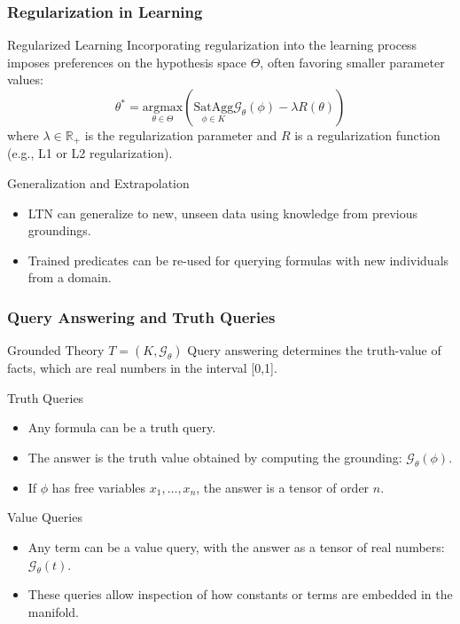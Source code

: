 \documentclass{beamer}
\newcommand{\G}{\mathcal{G}}
\begin{document}
\begin{frame}
\frametitle{Regularization in Learning}
\begin{block}{Regularized Learning}
Incorporating regularization into the learning process imposes preferences on the hypothesis space \( \Theta \), often favoring smaller parameter values:
\[ \theta^* = \underset{\theta \in \Theta}{\text{argmax}} \left( \underset{\phi \in K}{\text{SatAgg}}\G_\theta(\phi)  - \lambda R(\theta) \right) \]
where \( \lambda \in \mathbb{R}_+ \) is the regularization parameter and \( R \) is a regularization function (e.g., L1 or L2 regularization).
\end{block}

\begin{block}{Generalization and Extrapolation}
\begin{itemize}
    \item LTN can generalize to new, unseen data using knowledge from previous groundings.
    \item Trained predicates can be re-used for querying formulas with new individuals from a domain.
\end{itemize}
\end{block}
\end{frame}

\begin{frame}
\frametitle{Query Answering and Truth Queries}
\begin{block}{Grounded Theory \( T = (K, \G_\theta) \)}
Query answering determines the truth-value of facts, which are real numbers in the interval [0,1].
\end{block}

\begin{block}{Truth Queries}
\begin{itemize}
    \item Any formula can be a truth query.
    \item The answer is the truth value obtained by computing the grounding: \( \G_\theta(\phi) \).
    \item If \( \phi \) has free variables \( x_1, \ldots, x_n \), the answer is a tensor of order \( n \).
\end{itemize}
\end{block}

\begin{block}{Value Queries}
\begin{itemize}
    \item Any term can be a value query, with the answer as a tensor of real numbers: \( \G_\theta(t) \).
    \item These queries allow inspection of how constants or terms are embedded in the manifold.
\end{itemize}
\end{block}
\end{frame}
\end{document}

